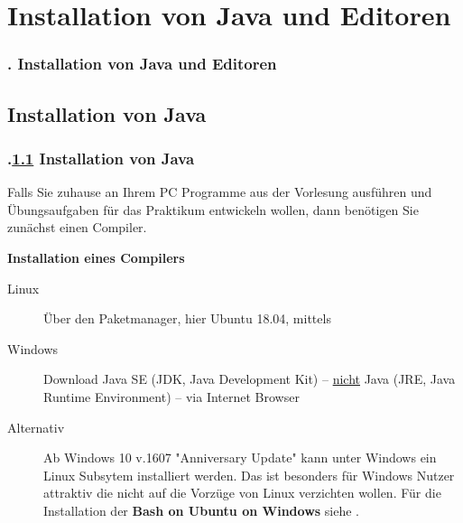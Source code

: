 \AtBeginSection{}
\section{Installation von Java und Editoren}
\begin{frame}
  \frametitle{\kap. Installation von Java und Editoren}%
\tableofcontents[current]
\end{frame}


\def\stitle{Installation von Java}%
\subsection{\stitle}\label{S:Compiler}
\begin{frame}[t]%
  \frametitle{\kap.\ref{S:Compiler} \stitle}%
\medskip

Falls Sie zuhause an Ihrem PC Programme aus der Vorlesung ausf\"uhren und \"Ubungsaufgaben f\"ur das Praktikum entwickeln wollen, dann ben\"otigen Sie zun\"achst einen Compiler.
\medskip

\textbf{Installation eines Compilers}
\begin{description}
  \item [Linux] \"Uber den Paketmanager, hier Ubuntu 18.04, mittels \\
  \item[Windows] Download Java SE (JDK, Java Development Kit) -- \underline{nicht} Java (JRE, Java Runtime Environment) -- via Internet Browser
  \item[Alternativ] Ab Windows 10 v.1607 "{}Anniversary Update"{} kann unter Windows ein Linux Subsytem installiert werden.
    Das ist besonders f\"ur Windows Nutzer attraktiv die nicht auf die Vorz\"uge von Linux verzichten wollen.
    F\"ur die Installation der \textbf{Bash on Ubuntu on Windows} siehe .
\end{description}
\end{frame}


\def\stitle{Editoren}%
